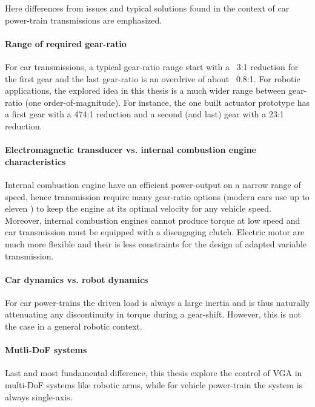 Here differences from issues and typical solutions found in the context of car power-train transmissions are emphasized.

\paragraph{Range of required gear-ratio}
%
For car transmissions, a typical gear-ratio range start with a ~3:1 reduction for the first gear and the last gear-ratio is an overdrive of about ~0.8:1. For robotic applications, the explored idea in this thesis is a much wider range between gear-ratio (one order-of-magnitude). For instance, the one built actuator prototype has a first gear with a 474:1 reduction and a second (and last) gear with a 23:1 reduction. 


\paragraph{Electromagnetic transducer vs. internal combustion engine characteristics}
%
Internal combustion engine have an efficient power-output on a narrow range of speed, hence transmission require many gear-ratio options (modern cars use up to eleven \cite{goleski_multi-speed_2015}) to keep the engine at its optimal velocity for any vehicle speed. Moreover, internal combustion engines cannot produce torque at low speed and car transmission must be equipped with a disengaging clutch.  Electric motor are much more flexible and their is less constraints for the design of adapted variable transmission. 

\paragraph{Car dynamics vs. robot dynamics}
%
For car power-trains the driven load is always a large inertia and is thus naturally attenuating any discontinuity in torque during a gear-shift. However, this is not the case in a general robotic context. 

\paragraph{Mutli-DoF systems}
%
Last and most fundamental difference, this thesis explore the control of VGA in multi-DoF systems like robotic arms, while for vehicle power-train the system is always single-axis.

